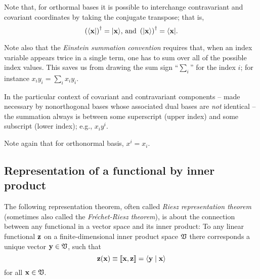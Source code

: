 Note that, for orthormal bases it is possible to interchange contravariant and covariant coordinates by
taking the conjugate transpose; that is,
\begin{equation}
\left(\langle {\bf x} \vert \right)^\dagger = \vert {\bf x}  \rangle
\textrm {, and }
\left(\vert {\bf x}  \rangle \right)^\dagger = \langle {\bf x} \vert
.
\label{2015-m-ch-fdlvs-inter}
\end{equation}


Note also that the {\em Einstein summation convention}
requires that, when an index variable appears twice in a single term, one has to
sum over all of the possible index values.
This saves us from drawing the sum sign ``$\sum_i$'' for the index $i$;
for instance $x_iy_i =\sum_{i}x_iy_i$.

In the particular context of covariant and contravariant components
--
made necessary by nonorthogonal bases whose associated dual bases are {\em not} identical
--
the summation always is between some superscript (upper index) and some subscript (lower index);
e.g., $x_iy^i$.

Note again that for orthonormal basis,
$x^i=x_i$.


\subsection{Representation of a functional by inner product}
\label{2011-m-corr-bil-ip}
The following representation theorem,
often called
{\em Riesz representation theorem}
(sometimes also called the {\em Fr\'echet-Riesz theorem}),
is about the connection between any functional
in a vector space and its inner product:
To any linear functional ${\bf z}$
on a finite-dimensional inner product space ${\frak V}$
there corresponds a unique vector   ${\bf y}\in {\frak V}$,
such that
\begin{equation}
{\bf z} ({\bf x}) \equiv \llbracket {\bf x}, {\bf z}\rrbracket = \langle {\bf y} \mid {\bf x} \rangle
\label{2015-m-ch-fdlvs-e1}
\end{equation}
for all ${\bf x}\in {\frak V}$.

